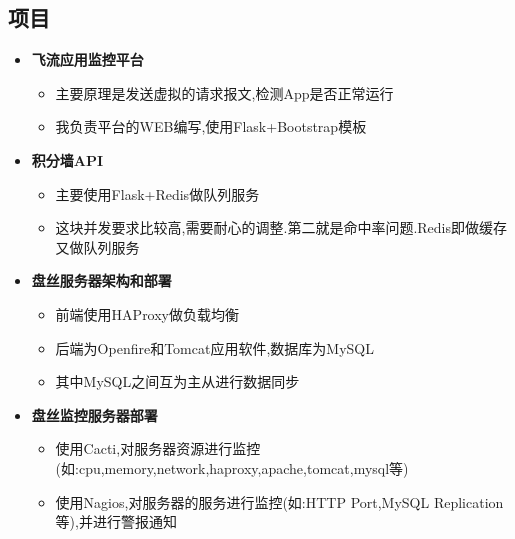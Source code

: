 \documentclass[11pt,letterpaper]{article}
\newcommand{\resitem}[1]{\item #1 \vspace{-2pt}}
\begin{document}
\begin{CJK}{UTF8}{gbsn}
\section{项目}  
       \begin{itemize}
		   \item{\textbf{飞流应用监控平台}}\vspace{-6pt}
                       {\footnotesize
                       \begin{itemize}
							   \resitem{主要原理是发送虚拟的请求报文,检测App是否正常运行}
                               \resitem{我负责平台的WEB编写,使用Flask+Bootstrap模板}
                       \end{itemize}
                       } 
		   \item{\textbf{积分墙API}}\vspace{-6pt}
                       {\footnotesize
                       \begin{itemize}
							   \resitem{主要使用Flask+Redis做队列服务}
                               \resitem{这块并发要求比较高,需要耐心的调整.第二就是命中率问题.Redis即做缓存又做队列服务}
                       \end{itemize}
                       } 
               \item{\textbf{盘丝服务器架构和部署}}\vspace{-6pt}
                       {\footnotesize
                       \begin{itemize}
                               \resitem{前端使用HAProxy做负载均衡}
                               \resitem{后端为Openfire和Tomcat应用软件,数据库为MySQL}
                               \resitem{其中MySQL之间互为主从进行数据同步}
                       \end{itemize}
                       } 
               \item{\textbf{盘丝监控服务器部署}}\vspace{-6pt}
                       {\footnotesize
                       \begin{itemize}
                               \resitem{使用Cacti,对服务器资源进行监控(如:cpu,memory,network,haproxy,apache,tomcat,mysql等)}
                               \resitem{使用Nagios,对服务器的服务进行监控(如:HTTP Port,MySQL Replication等),并进行警报通知}
                       \end{itemize}
                       }
		\end{itemize}


\end{CJK}
\end{document}
